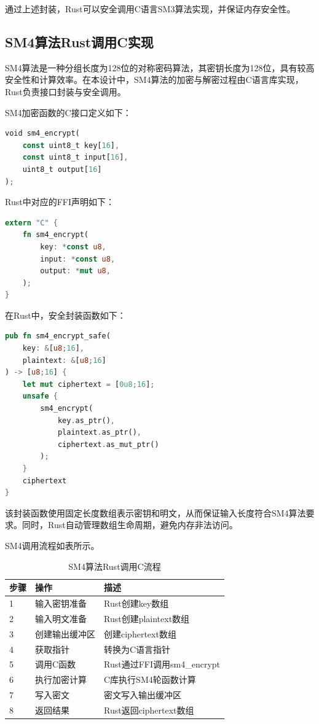 通过上述封装，Rust可以安全调用C语言SM3算法实现，并保证内存安全性。

\subsection{SM4算法Rust调用C实现}

SM4算法是一种分组长度为128位的对称密码算法，其密钥长度为128位，具有较高安全性和计算效率。在本设计中，SM4算法的加密与解密过程由C语言库实现，Rust负责接口封装与安全调用。

SM4加密函数的C接口定义如下：

\begin{lstlisting}[language=Rust, caption={sm3hash}]
void sm4_encrypt(
    const uint8_t key[16],
    const uint8_t input[16],
    uint8_t output[16]
);
\end{lstlisting}

Rust中对应的FFI声明如下：

\begin{lstlisting}[language=Rust, caption={sm4encrypt}]
extern "C" {
    fn sm4_encrypt(
        key: *const u8,
        input: *const u8,
        output: *mut u8,
    );
}
\end{lstlisting}

在Rust中，安全封装函数如下：

\begin{lstlisting}[language=Rust, caption={sm4encrypt}]
pub fn sm4_encrypt_safe(
    key: &[u8;16],
    plaintext: &[u8;16]
) -> [u8;16] {
    let mut ciphertext = [0u8;16];
    unsafe {
        sm4_encrypt(
            key.as_ptr(),
            plaintext.as_ptr(),
            ciphertext.as_mut_ptr()
        );
    }
    ciphertext
}
\end{lstlisting}

该封装函数使用固定长度数组表示密钥和明文，从而保证输入长度符合SM4算法要求。同时，Rust自动管理数组生命周期，避免内存非法访问。

SM4调用流程如表所示。

\begin{table}[H]
\centering
\caption{SM4算法Rust调用C流程}
\begin{tabular}{lll}
\toprule
步骤 & 操作 & 描述 \\
\midrule
1 & 输入密钥准备 & Rust创建key数组 \\
2 & 输入明文准备 & Rust创建plaintext数组 \\
3 & 创建输出缓冲区 & 创建ciphertext数组 \\
4 & 获取指针 & 转换为C语言指针 \\
5 & 调用C函数 & Rust通过FFI调用sm4\_encrypt \\
6 & 执行加密计算 & C库执行SM4轮函数计算 \\
7 & 写入密文 & 密文写入输出缓冲区 \\
8 & 返回结果 & Rust返回ciphertext数组 \\
\bottomrule
\end{tabular}
\end{table}

